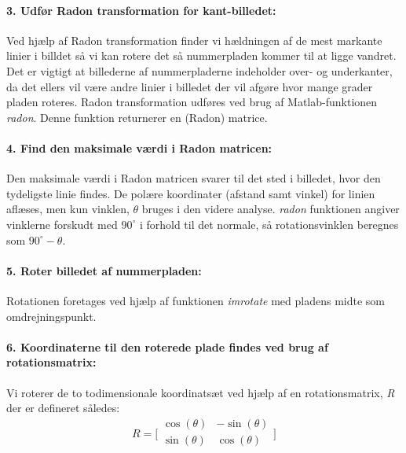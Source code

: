 \paragraph{3. Udfør Radon transformation for kant-billedet:}
Ved hjælp af Radon transformation finder vi hældningen af de mest markante linier i billdet så vi kan rotere det så nummerpladen kommer til at ligge vandret. Det er vigtigt at billederne af nummerpladerne indeholder over- og underkanter, da det ellers vil være andre linier i billedet der vil afgøre hvor mange grader pladen roteres. Radon transformation udføres ved brug af Matlab-funktionen \textit{radon}. Denne funktion returnerer en (Radon) matrice.

\paragraph{4. Find den maksimale værdi i Radon matricen:} Den maksimale værdi i Radon matricen svarer til det sted i billedet, hvor den tydeligste linie findes. De polære koordinater (afstand samt vinkel) for linien aflæses, men kun vinklen, $\theta$ bruges i den videre analyse. \textit{radon} funktionen angiver vinklerne forskudt med $90^{\circ}$ i forhold til det normale, så rotationsvinklen beregnes som $90^{\circ} - \theta$.

\paragraph{5. Roter billedet af nummerpladen:} Rotationen foretages ved hjælp af funktionen \textit{imrotate} med pladens midte som omdrejningspunkt.

\paragraph{6. Koordinaterne til den roterede plade findes ved brug af rotationsmatrix:} Vi roterer de to todimensionale koordinatsæt ved hjælp af en rotationsmatrix, \textit{R} der er defineret således:
\begin{displaymath} 
R = 
\biggl[ \begin{array}{cc} 
\cos(\theta) & - \sin(\theta) \\
\sin(\theta) & \cos(\theta) \\
\end{array} \biggr] 
\end{displaymath}

